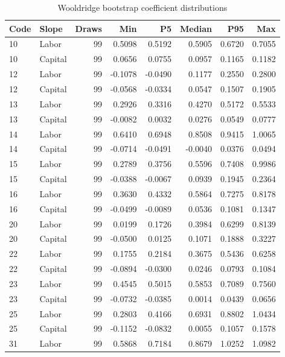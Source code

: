 \begin{table}[H]
\centering
\caption{Wooldridge bootstrap coefficient distributions}
\begingroup\fontsize{9.2}{11.2}\selectfont
\setlength{\tabcolsep}{4.3pt}\renewcommand{\arraystretch}{1.1}
\begin{tabular}{llrrrrrr}
\toprule
Code & Slope & Draws & Min & P5 & Median & P95 & Max \\
\midrule
10 & Labor & 99 & 0.5098 & 0.5192 & 0.5905 & 0.6720 & 0.7055 \\
10 & Capital & 99 & 0.0656 & 0.0755 & 0.0957 & 0.1165 & 0.1182 \\
12 & Labor & 99 & -0.1078 & -0.0490 & 0.1177 & 0.2550 & 0.2800 \\
12 & Capital & 99 & -0.0568 & -0.0334 & 0.0547 & 0.1507 & 0.1905 \\
13 & Labor & 99 & 0.2926 & 0.3316 & 0.4270 & 0.5172 & 0.5533 \\
13 & Capital & 99 & -0.0082 & 0.0032 & 0.0276 & 0.0549 & 0.0777 \\
14 & Labor & 99 & 0.6410 & 0.6948 & 0.8508 & 0.9415 & 1.0065 \\
14 & Capital & 99 & -0.0714 & -0.0491 & -0.0040 & 0.0376 & 0.0494 \\
15 & Labor & 99 & 0.2789 & 0.3756 & 0.5596 & 0.7408 & 0.9986 \\
15 & Capital & 99 & -0.0388 & -0.0067 & 0.0939 & 0.1945 & 0.2364 \\
16 & Labor & 99 & 0.3630 & 0.4332 & 0.5864 & 0.7275 & 0.8178 \\
16 & Capital & 99 & -0.0499 & -0.0089 & 0.0536 & 0.1081 & 0.1347 \\
20 & Labor & 99 & 0.0199 & 0.1726 & 0.3984 & 0.6299 & 0.8139 \\
20 & Capital & 99 & -0.0500 & 0.0125 & 0.1071 & 0.1888 & 0.3227 \\
22 & Labor & 99 & 0.1755 & 0.2184 & 0.3675 & 0.5436 & 0.6258 \\
22 & Capital & 99 & -0.0894 & -0.0300 & 0.0246 & 0.0793 & 0.1084 \\
23 & Labor & 99 & 0.4545 & 0.5015 & 0.5853 & 0.7089 & 0.7560 \\
23 & Capital & 99 & -0.0732 & -0.0385 & 0.0014 & 0.0439 & 0.0656 \\
25 & Labor & 99 & 0.2803 & 0.4166 & 0.6931 & 0.8802 & 1.0434 \\
25 & Capital & 99 & -0.1152 & -0.0832 & 0.0055 & 0.1057 & 0.1578 \\
31 & Labor & 99 & 0.5868 & 0.7184 & 0.8679 & 1.0252 & 1.0982 \\

\end{tabular}
\end{table}
